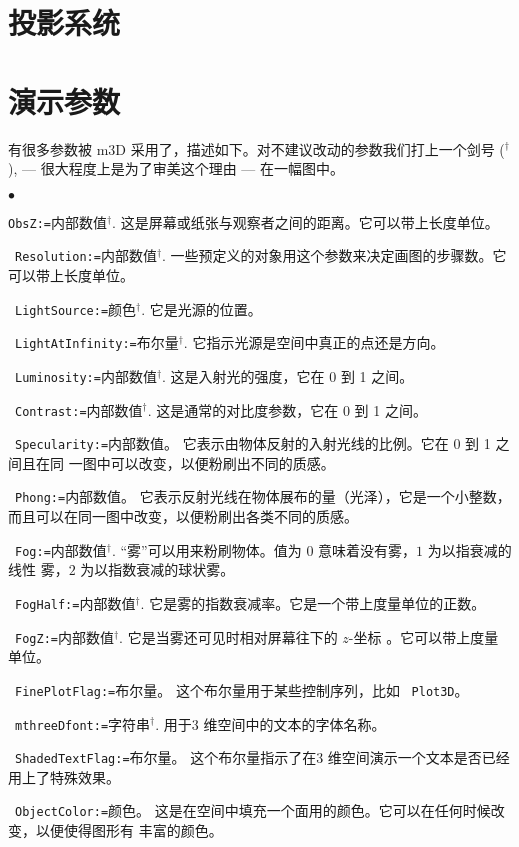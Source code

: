 \documentclass[a4paper,12pt]{article}
\newlength{\mmfontsize}
\newcommand{\listparam}{\setlength{\parsep}{\parskip}
 \setlength{\itemsep}{0ex plus 0.1ex}
 \setlength{\labelwidth}{2\mmfontsize}
 \setlength{\labelsep}{.5\mmfontsize}
 \setlength{\topsep}{0pt}
 \setlength{\partopsep}{0pt}
 \setlength{\leftmargin}{2\mmfontsize}
}
\begin{document}
  
\section{投影系统}

\section{演示参数}

有很多参数被 m3D 采用了，描述如下。对不建议改动的参数我们打上一个剑号
($^{\dagger}$), --- 很大程度上是为了审美这个理由 --- 在一幅图中。
\begin{list}{$\bullet$}{\listparam}
\item{\tt ObsZ:=}内部数值$^{\dagger}$.
  这是屏幕或纸张与观察者之间的距离。它可以带上长度单位。
\item~{\tt Resolution:=}内部数值$^{\dagger}$.
  一些预定义的对象用这个参数来决定画图的步骤数。它可以带上长度单位。
\item~{\tt LightSource:=}颜色$^{\dagger}$.
  它是光源的位置。
\item~{\tt LightAtInfinity:=}布尔量$^{\dagger}$.
  它指示光源是空间中真正的点还是方向。
\item~{\tt Luminosity:=}内部数值$^{\dagger}$.
  这是入射光的强度，它在 0 到 1 之间。
\item~{\tt Contrast:=}内部数值$^{\dagger}$.
  这是通常的对比度参数，它在 0 到 1 之间。
\item~{\tt Specularity:=}内部数值。
  它表示由物体反射的入射光线的比例。它在 0 到 1 之间且在同
  一图中可以改变，以便粉刷出不同的质感。             
\item~{\tt Phong:=}内部数值。
  它表示反射光线在物体展布的量（光泽），它是一个小整数，
  而且可以在同一图中改变，以便粉刷出各类不同的质感。
\item~{\tt Fog:=}内部数值$^{\dagger}$.
  “雾”可以用来粉刷物体。值为 $0$ 意味着没有雾，$1$ 为以指衰减的线性
  雾，$2$ 为以指数衰减的球状雾。                 
\item~{\tt FogHalf:=}内部数值$^{\dagger}$.
  它是雾的指数衰减率。它是一个带上度量单位的正数。
\item~{\tt FogZ:=}内部数值$^{\dagger}$.
  它是当雾还可见时相对屏幕往下的 $z$-坐标 。它可以带上度量单位。                     
\item~{\tt FinePlotFlag:=}布尔量。
  这个布尔量用于某些控制序列，比如 ~{\tt Plot3D}。
\item~{\tt mthreeDfont:=}字符串$^{\dagger}$.
  用于3 维空间中的文本的字体名称。
\item~{\tt ShadedTextFlag:=}布尔量。
  这个布尔量指示了在3 维空间演示一个文本是否已经用上了特殊效果。
\item~{\tt ObjectColor:=}颜色。
  这是在空间中填充一个面用的颜色。它可以在任何时候改变，以便使得图形有  
  丰富的颜色。
\end{list}
                           
\end{document}
